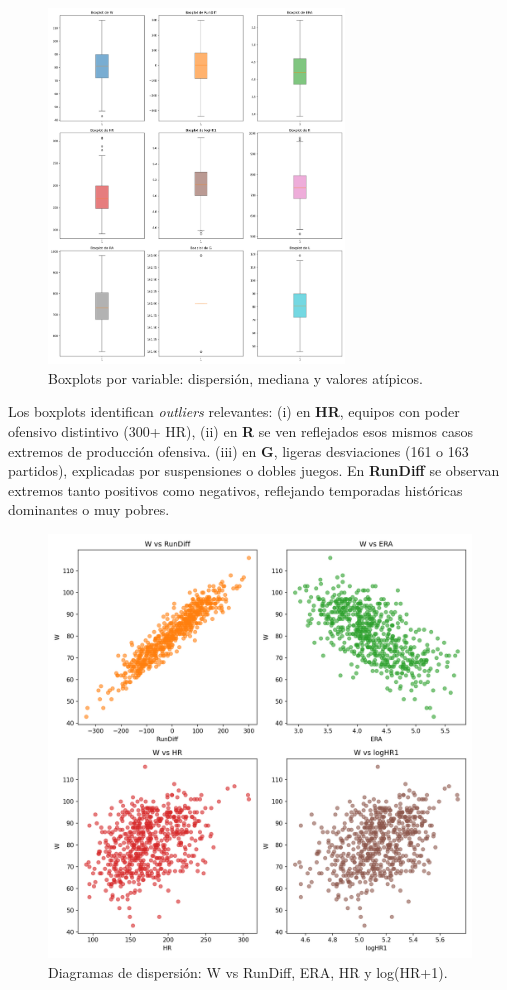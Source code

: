 \documentclass[man,floatsintext]{apa7}
\begin{document}
\begin{figure}[H]
    \centering
    \includegraphics[width=0.7\textwidth]{../plots/all_boxplots.png}
    \caption{Boxplots por variable: dispersión, mediana y valores atípicos.}
\end{figure}

Los boxplots identifican \textit{outliers} relevantes: 
(i) en \textbf{HR}, equipos con poder ofensivo distintivo (300+ HR), 
(ii) en \textbf{R} se ven reflejados esos mismos casos extremos de producción ofensiva.
(iii) en \textbf{G}, ligeras desviaciones (161 o 163 partidos), explicadas por suspensiones o dobles juegos. 
En \textbf{RunDiff} se observan extremos tanto positivos como negativos, reflejando temporadas históricas dominantes o muy pobres.

\begin{figure}[H]
    \centering
    \includegraphics[width=\textwidth]{../plots/all_scatter_W.png}
    \caption{Diagramas de dispersión: W vs RunDiff, ERA, HR y log(HR+1).}
\end{figure}
\end{document}
